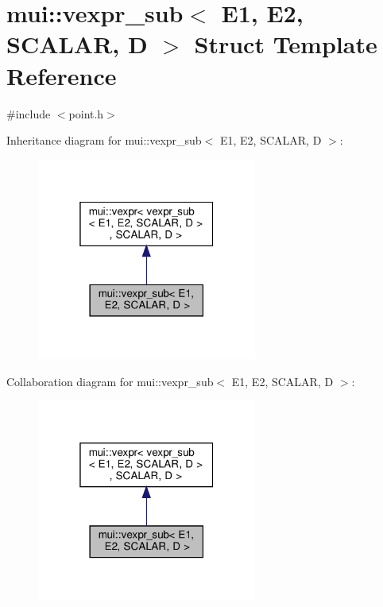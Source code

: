 \hypertarget{structmui_1_1vexpr__sub}{}\section{mui\+:\+:vexpr\+\_\+sub$<$ E1, E2, S\+C\+A\+L\+AR, D $>$ Struct Template Reference}
\label{structmui_1_1vexpr__sub}


{\ttfamily \#include $<$point.\+h$>$}



Inheritance diagram for mui\+:\+:vexpr\+\_\+sub$<$ E1, E2, S\+C\+A\+L\+AR, D $>$\+:
\nopagebreak
\begin{figure}[H]
\begin{center}
\leavevmode
\includegraphics[width=205pt]{structmui_1_1vexpr__sub__inherit__graph}
\end{center}
\end{figure}


Collaboration diagram for mui\+:\+:vexpr\+\_\+sub$<$ E1, E2, S\+C\+A\+L\+AR, D $>$\+:
\nopagebreak
\begin{figure}[H]
\begin{center}
\leavevmode
\includegraphics[width=205pt]{structmui_1_1vexpr__sub__coll__graph}
\end{center}
\end{figure}
